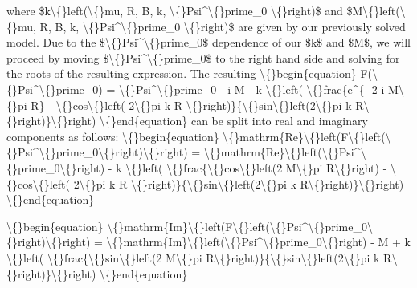 \documentclass{article}
\begin{document}
where \$k\textbackslash\{\}left(\textbackslash\{\}mu, R, B, k, \textbackslash\{\}Psi\textasciicircum{}\textbackslash\{\}prime\_0 \textbackslash\{\}right)\$ and \$M\textbackslash\{\}left(\textbackslash\{\}mu, R, B, k, \textbackslash\{\}Psi\textasciicircum{}\textbackslash\{\}prime\_0 \textbackslash\{\}right)\$ are given by our previously solved model. Due to the \$\textbackslash\{\}Psi\textasciicircum{}\textbackslash\{\}prime\_0\$ dependence of our \$k\$ and \$M\$, we will proceed by moving \$\textbackslash\{\}Psi\textasciicircum{}\textbackslash\{\}prime\_0\$ to the right hand side and solving for the roots of the resulting expression. The resulting 
\textbackslash\{\}begin\{equation\}
F(\textbackslash\{\}Psi\textasciicircum{}\textbackslash\{\}prime\_0) =  \textbackslash\{\}Psi\textasciicircum{}\textbackslash\{\}prime\_0 - i M - k \textbackslash\{\}left( \textbackslash\{\}frac\{e\textasciicircum{}\{- 2 i M\textbackslash\{\}pi R\} - \textbackslash\{\}cos\textbackslash\{\}left( 2\textbackslash\{\}pi k R \textbackslash\{\}right)\}\{\textbackslash\{\}sin\textbackslash\{\}left(2\textbackslash\{\}pi k R\textbackslash\{\}right)\}\textbackslash\{\}right)
\textbackslash\{\}end\{equation\}
can be split into real and imaginary components as follows:
\textbackslash\{\}begin\{equation\}
\textbackslash\{\}mathrm\{Re\}\textbackslash\{\}left(F\textbackslash\{\}left(\textbackslash\{\}Psi\textasciicircum{}\textbackslash\{\}prime\_0\textbackslash\{\}right)\textbackslash\{\}right) =  \textbackslash\{\}mathrm\{Re\}\textbackslash\{\}left(\textbackslash\{\}Psi\textasciicircum{}\textbackslash\{\}prime\_0\textbackslash\{\}right) - k \textbackslash\{\}left( \textbackslash\{\}frac\{\textbackslash\{\}cos\textbackslash\{\}left(2 M\textbackslash\{\}pi R\textbackslash\{\}right) - \textbackslash\{\}cos\textbackslash\{\}left( 2\textbackslash\{\}pi k R \textbackslash\{\}right)\}\{\textbackslash\{\}sin\textbackslash\{\}left(2\textbackslash\{\}pi k R\textbackslash\{\}right)\}\textbackslash\{\}right)
\textbackslash\{\}end\{equation\}

\textbackslash\{\}begin\{equation\}
\textbackslash\{\}mathrm\{Im\}\textbackslash\{\}left(F\textbackslash\{\}left(\textbackslash\{\}Psi\textasciicircum{}\textbackslash\{\}prime\_0\textbackslash\{\}right)\textbackslash\{\}right) = \textbackslash\{\}mathrm\{Im\}\textbackslash\{\}left(\textbackslash\{\}Psi\textasciicircum{}\textbackslash\{\}prime\_0\textbackslash\{\}right) - M + k \textbackslash\{\}left( \textbackslash\{\}frac\{\textbackslash\{\}sin\textbackslash\{\}left(2 M\textbackslash\{\}pi R\textbackslash\{\}right)\}\{\textbackslash\{\}sin\textbackslash\{\}left(2\textbackslash\{\}pi k R\textbackslash\{\}right)\}\textbackslash\{\}right)
\textbackslash\{\}end\{equation\}
\end{document}
